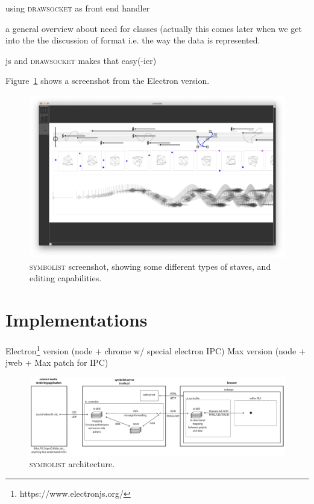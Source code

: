 \documentclass{article}
\def\symbolist{\textsc{symbolist}\xspace}
\def\drawsocket{\textsc{drawsocket}\xspace}
\begin{document}
using \drawsocket as front end handler 


a general overview about need for classes (actually this comes later when we get into the the discussion of format i.e. the way the data is represented.

js and \drawsocket makes that easy(-ier)


Figure~\ref{fig:screenshot} shows a screenshot from the Electron version.


\begin{figure}[ht!]
\centering
\includegraphics[width=2\columnwidth]{symbolist.png}
\caption{ \symbolist screenshot, showing some different types of staves, and editing capabilities.
\label{fig:screenshot}}
\end{figure}


\section{Implementations}\label{sec:implementations}

Electron\footnote{https://www.electronjs.org/} version (node + chrome w/ special electron IPC)
Max version (node + jweb + Max patch for IPC)


\begin{figure}[ht!]
\centering
\includegraphics[width=2\columnwidth]{symbolist-architecture2.pdf}
\caption{ \symbolist architecture.
\label{fig:architecture}}
\end{figure}
\end{document}
